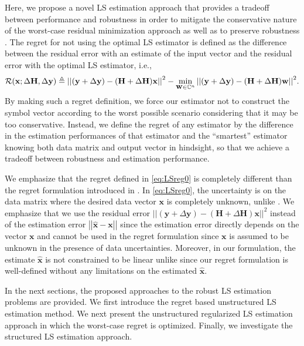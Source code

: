 \documentclass[review,sort&compress]{elsarticle}
\renewcommand{\vec}[1]{\mbox{$\mathbf{#1}$}}
\newcommand{\norm}[1]{\left|\left|#1\right|\right|}
\newcommand{\defi}{\triangleq}
\newcommand{\C}{\mathbb{C}}
\newcommand{\R}{{\cal R}}
\newcommand{\vH}{\vec{H}}
\newcommand{\vx}{\vec{x}}
\newcommand{\vy}{\vec{y}}
\newcommand{\dH}{\Delta\vH}
\newcommand{\dy}{\Delta\vy}
\newcommand{\vw}{\vec{w}}
\begin{document}
Here, we propose a novel LS estimation approach that provides a tradeoff between performance and robustness in order to mitigate the conservative nature of the worst-case residual minimization approach as well as to preserve robustness \cite{yonina1, yonina3}. The regret for not using the optimal LS estimator is defined as the difference between the residual error with an estimate of the input vector and the residual error with the optimal LS estimator, i.e.,
\begin{equation}\label{eq:LSreg0}
  \R(\vx; \dH,\dy) \defi {\norm{(\vy+\dy)-(\vH + \dH)\vx}}^2 - \min_{\vw \in \C^n}{\norm{(\vy+\dy)-(\vH +\dH)\vw}}^2.
\end{equation}
By making such a regret definition, we force our estimator not to construct the symbol vector according to the worst possible scenario considering that it may be too conservative. Instead, we define the regret of any estimator by the difference in the estimation performances of that estimator and the ``smartest'' estimator knowing both data matrix and output vector in hindsight, so that we achieve a tradeoff between robustness and estimation performance.

We emphasize that the regret defined in \eqref{eq:LSreg0} is completely different than the regret formulation introduced in \cite{yonina1, yonina3}. In \eqref{eq:LSreg0}, the uncertainty is on the data matrix where the desired data vector $\vx$ is completely unknown, unlike \cite{yonina1, yonina3}. We emphasize that we use the residual error ${\norm{(\vy+\dy)-(\vH + \dH)\vx}}^2$ instead of the estimation error $\norm{\hat{\vx} - \vx}$ since the estimation error directly depends on the vector $\vx$ and cannot be used in the regret formulation since $\vx$ is assumed to be unknown in the presence of data uncertainties. Moreover, in our formulation, the estimate $\hat{\vx}$ is not constrained to be linear unlike \cite{yonina1, yonina3} since our regret formulation is well-defined without any limitations on the estimated $\hat{\vx}$.

In the next sections, the proposed approaches to the robust LS estimation problems are provided. We first introduce the regret based unstructured LS estimation method. We next present the unstructured regularized LS estimation approach in which the worst-case regret is optimized. Finally, we investigate the structured LS estimation approach.
\end{document}
